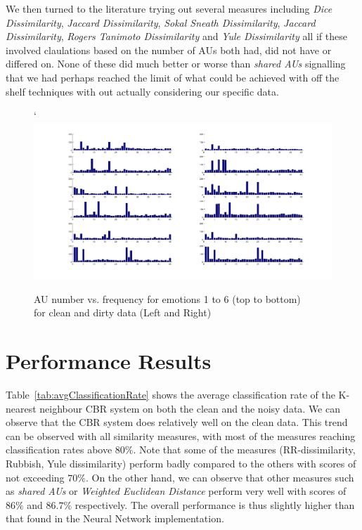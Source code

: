 \documentclass[10pt,a4paper]{article}
\begin{document}
We then turned to the literature trying out several measures including \emph{Dice Dissimilarity}, \emph{Jaccard Dissimilarity}, \emph{Sokal Sneath Dissimilarity}, \emph{Jaccard Dissimilarity}, \emph{Rogers Tanimoto Dissimilarity} and \emph{Yule Dissimilarity} all if these involved claulations based on the number of AUs both had, did not have or differed on. 
None of these did much better or worse than \emph{shared AUs} signalling that we had perhaps reached the limit of what could be achieved with off the shelf techniques with out actually considering our specific data.
\begin{figure}[!t]
	\centering
`	\includegraphics[scale=0.5, angle=90]{images/au_count.png}
	\caption{AU number vs. frequency for emotions 1 to 6 (top to bottom) \\for clean and dirty data (Left and Right)}
	\label{fig:au_counts}
\end{figure}

\section{Performance Results}

Table~\ref{tab:avgClassificationRate} shows the average classification rate of the K-nearest neighbour CBR system on both the clean and the noisy data. We can observe that the CBR system does relatively well on the clean data. This trend can be observed with all similarity measures, with most of the measures reaching classification rates above $80\%$. Note that some of the measures (RR-dissimilarity, Rubbish, Yule dissimilarity) perform badly compared to the others with scores of not exceeding $70\%$. On the other hand, we can observe that other measures such as \emph{shared AUs} or \emph{Weighted Euclidean Distance} perform very well with scores of $86\%$ and $86.7\%$ respectively. The overall performance is thus slightly higher than that found in the Neural Network implementation.
\end{document}
